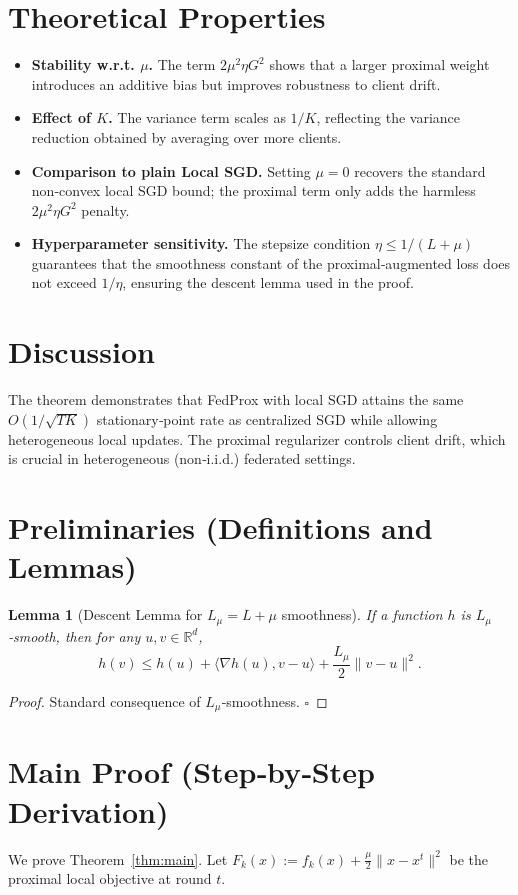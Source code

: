 \documentclass[11pt]{article}
\newtheorem{lemma}{Lemma}
\newcommand{\R}{\mathbb{R}}
\begin{document}
\section*{Theoretical Properties}
\begin{itemize}
    \item \textbf{Stability w.r.t. $\mu$.} The term $2\mu^{2}\eta G^{2}$ shows that a larger proximal weight introduces an additive bias but improves robustness to client drift.
    \item \textbf{Effect of $K$.} The variance term scales as $1/K$, reflecting the variance reduction obtained by averaging over more clients.
    \item \textbf{Comparison to plain Local SGD.} Setting $\mu=0$ recovers the standard non‑convex local SGD bound; the proximal term only adds the harmless $2\mu^{2}\eta G^{2}$ penalty.
    \item \textbf{Hyperparameter sensitivity.} The stepsize condition $\eta\le1/(L+\mu)$ guarantees that the smoothness constant of the proximal‑augmented loss does not exceed $1/\eta$, ensuring the descent lemma used in the proof.
\end{itemize}

\section*{Discussion}
The theorem demonstrates that FedProx with local SGD attains the same $O(1/\sqrt{TK})$ stationary‑point rate as centralized SGD while allowing heterogeneous local updates. The proximal regularizer controls client drift, which is crucial in heterogeneous (non‑i.i.d.) federated settings.

\newpage
\section*{Preliminaries (Definitions and Lemmas)}
\begin{lemma}[Descent Lemma for $L_{\mu}=L+\mu$ smoothness]\label{lem:descent}
If a function $h$ is $L_{\mu}$‑smooth, then for any $u,v\in\R^{d}$,
\[
    h(v)\le h(u)+\langle\nabla h(u),v-u\rangle+\frac{L_{\mu}}{2}\|v-u\|^{2}.
\]
\end{lemma}
\begin{proof}
Standard consequence of $L_{\mu}$‑smoothness. $\square$
\end{proof}

\section*{Main Proof (Step‑by‑Step Derivation)}
We prove Theorem~\ref{thm:main}. Let $F_k(x):=f_k(x)+\frac{\mu}{2}\|x-x^{t}\|^{2}$ be the proximal local objective at round $t$.  
\end{document}
